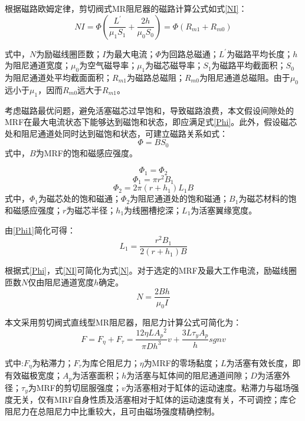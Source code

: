 根据磁路欧姆定律，剪切阀式MR阻尼器的磁路计算公式如式\eqref{NI}：
\begin{equation}
NI=\Phi\left(\frac{L^{'}}{\mu_1S_1}+\frac{2h}{\mu_0S_0}\right)=\Phi\left(R_{m1}+R_{m0}\right) \label{NI}
\end{equation}

式中，$N$为励磁线圈匝数；$I$为最大电流；$\Phi$为回路总磁通；$L^{'}$为磁路平均长度；$h$为阻尼通道宽度；$\mu_0$为空气磁导率；$\mu_1$为磁芯磁导率；$S_1$为磁路平均截面积；$S_0$为阻尼通道处平均截面面积；$R_{m1}$为磁路总磁阻；$R_{m0}$为阻尼通道总磁阻。由于$\mu_0$远小于$\mu_1$，因而$R_{m0}$远大于$R_{m1}$。

考虑磁路最优问题，避免活塞磁芯过早饱和，导致磁路浪费，本文假设间隙处的MRF在最大电流状态下能够达到磁饱和状态，即应满足式\eqref{Phi}。此外，假设磁芯处和阻尼通道处同时达到磁饱和状态，可建立磁路关系如式：
\begin{equation}
\Phi=BS_0\label{Phi}
\end{equation}
式中，$B$为MRF的饱和磁感应强度。

\begin{equation}
\Phi_1=\Phi_2\label{Phi1}
\end{equation}
\begin{equation}
\Phi_1=\pi r^2B_1\label{Phi2}
\end{equation}
\begin{equation}
\Phi_2=2\pi\left(r+h_1\right)L_1B\label{Phi3}
\end{equation}
式中，$\Phi_1$为磁芯处的饱和磁通；$\Phi_2$为阻尼通道处的饱和磁通；$B_1$为磁芯材料的饱和磁感应强度；$r$为磁芯半径；$h_1$为线圈槽挖深；$L_1$为活塞翼缘宽度。

由\eqref{Phi1}简化可得：
\begin{equation}
L_1=\frac{r^2B_1}{2\left(r+h_1\right)B}
\end{equation}

根据式\eqref{Phi}，式\eqref{NI}可简化为式\eqref{N}。对于选定的MRF及最大工作电流，励磁线圈匝数$N$仅由阻尼通道宽度$h$确定。
\begin{equation}
N=\frac{2Bh}{\mu_0I}\label{N}
\end{equation}

本文采用剪切阀式直线型MR阻尼器，阻尼力计算公式可简化为：
\begin{equation}
F=F_{\eta}+F_{\tau}=\frac{12\eta LA{_p}{^2}}{\pi Dh^3}v+\frac{3L\tau_yA_p}{h}sgnv\label{F}
\end{equation}

式中:$F_{\eta}$为粘滞力；$F_{\tau}$为库仑阻尼力；$\eta$为MRF的零场黏度；$L$为活塞有效长度，即有效磁极宽度；$A_p$为活塞面积；$h$为活塞与缸体间的阻尼通道间隙；$D$为活塞外径；$\tau_y$为MRF的剪切屈服强度；$v$为活塞相对于缸体的运动速度。粘滞力与磁场强度无关，仅有MRF自身性质及活塞相对于缸体的运动速度有关，不可调控；库仑阻尼力在总阻尼力中比重较大，且可由磁场强度精确控制。

